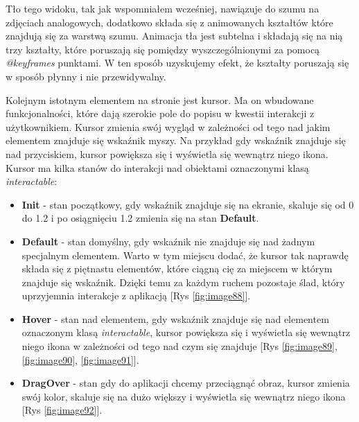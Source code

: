 Tło tego widoku, tak jak wspomniałem wcześniej, nawiązuje do szumu na zdjęciach analogowych, dodatkowo składa się z animowanych kształtów które znajdują się za warstwą szumu. Animacja tła jest subtelna i składają się na nią trzy kształty, które poruszają się pomiędzy wyszczególnionymi za pomocą \textit{@keyframes} punktami. W ten sposób uzyskujemy efekt, że kształty poruszają się w sposób płynny i nie przewidywalny.

Kolejnym istotnym elementem na stronie jest kursor. Ma on wbudowane funkcjonalności, które dają szerokie pole do popisu w kwestii interakcji z użytkownikiem. Kursor zmienia swój wygląd w zależności od tego nad jakim elementem znajduje się wskaźnik myszy. Na przykład gdy wskaźnik znajduje się nad przyciskiem, kursor powiększa się i wyświetla się wewnątrz niego ikona. 
Kursor ma kilka stanów do interakcji nad obiektami oznaczonymi klasą \textit{interactable}:

\begin{itemize}
    \item \textbf{Init} - stan początkowy, gdy wskaźnik znajduje się na ekranie, skaluje się od 0 do 1.2 i po osiągnięciu 1.2 zmienia się na stan \textbf{Default}.
    \item \textbf{Default} - stan domyślny, gdy wskaźnik nie znajduje się nad żadnym specjalnym elementem. Warto w tym miejscu dodać, że kursor tak naprawdę składa się z piętnastu elementów, które ciągną cię za miejscem w którym znajduje się wskaźnik. Dzięki temu za każdym ruchem pozostaje ślad, który uprzyjemnia interakcje z aplikacją [Rys \ref{fig:image88}].
    \item \textbf{Hover} - stan nad elementem, gdy wskaźnik znajduje się nad elementem oznaczonym klasą \textit{interactable}, kursor powiększa się i wyświetla się wewnątrz niego ikona w zależności od tego nad czym się znajduje [Rys \ref{fig:image89}, \ref{fig:image90}, \ref{fig:image91}].
    \item \textbf{DragOver} - stan gdy do aplikacji chcemy przeciągnąć obraz, kursor zmienia swój kolor, skaluje się na dużo większy i wyświetla się wewnątrz niego ikona [Rys \ref{fig:image92}].
\end{itemize}

